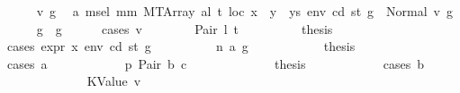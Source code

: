 \begin{isabellebody}
\ \ \ \ \isamarkupfalse%
\ v{}{\isacharprime}{\kern0pt}\ g{}{\isacharprime}{\kern0pt}\ \isamarkupfalse%
\ a{}{\isacharcolon}{\kern0pt}\ {\isachardoublequoteopen}msel\ mm\ {\isacharparenleft}{\kern0pt}MTArray\ al\ t{\isacharparenright}{\kern0pt}\ loc\ {\isacharparenleft}{\kern0pt}x\ {\isacharhash}{\kern0pt}\ y\ {\isacharhash}{\kern0pt}\ ys{\isacharparenright}{\kern0pt}\ env\ cd\ st\ g\ {\isacharequal}{\kern0pt}\ Normal\ {\isacharparenleft}{\kern0pt}v{}{\isacharprime}{\kern0pt}{\isacharcomma}{\kern0pt}\ g{}{\isacharprime}{\kern0pt}{\isacharparenright}{\kern0pt}{\isachardoublequoteclose}\isanewline
\ \ \ \ \isamarkupfalse%
\ {\isachardoublequoteopen}g{}{\isacharprime}{\kern0pt}\ {\isasymle}\ g{\isachardoublequoteclose}\isanewline
\ \ \ \ \isamarkupfalse%
\ {\isacharparenleft}{\kern0pt}cases\ v{}{\isacharprime}{\kern0pt}{\isacharparenright}{\kern0pt}\isanewline
\ \ \ \ \ \ \isamarkupfalse%
\ {\isacharparenleft}{\kern0pt}Pair\ l{}{\isacharprime}{\kern0pt}\ t{}{\isacharprime}{\kern0pt}{\isacharparenright}{\kern0pt}\isanewline
\ \ \ \ \ \ \isamarkupfalse%
\ \isamarkupfalse%
\ {\isacharquery}{\kern0pt}thesis\isanewline
\ \ \ \ \ \ \isamarkupfalse%
\ {\isacharparenleft}{\kern0pt}cases\ {\isachardoublequoteopen}expr\ x\ env\ cd\ st\ g{\isachardoublequoteclose}{\isacharparenright}{\kern0pt}\isanewline
\ \ \ \ \ \ \ \ \isamarkupfalse%
\ {\isacharparenleft}{\kern0pt}n\ a\ g{\isacharprime}{\kern0pt}{\isacharparenright}{\kern0pt}\isanewline
\ \ \ \ \ \ \ \ \isamarkupfalse%
\ \isamarkupfalse%
\ {\isacharquery}{\kern0pt}thesis\isanewline
\ \ \ \ \ \ \ \ \isamarkupfalse%
\ {\isacharparenleft}{\kern0pt}cases\ a{\isacharparenright}{\kern0pt}\isanewline
\ \ \ \ \ \ \ \ \ \ \isamarkupfalse%
\ p{}{\isacharcolon}{\kern0pt}\ {\isacharparenleft}{\kern0pt}Pair\ b\ c{\isacharparenright}{\kern0pt}\isanewline
\ \ \ \ \ \ \ \ \ \ \isamarkupfalse%
\ \isamarkupfalse%
\ {\isacharquery}{\kern0pt}thesis\isanewline
\ \ \ \ \ \ \ \ \ \ \isamarkupfalse%
\ {\isacharparenleft}{\kern0pt}cases\ b{\isacharparenright}{\kern0pt}\isanewline
\ \ \ \ \ \ \ \ \ \ \ \ \isamarkupfalse%
\ {\isacharparenleft}{\kern0pt}KValue\ v{\isacharparenright}{\kern0pt}\isanewline
\ \ \ \ \ \ \ \ \ \ \ \ \isamarkupfalse%

\end{isabellebody}

